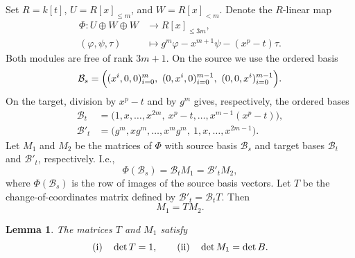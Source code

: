 \documentclass{amsart}
\newtheorem{lemma}[theorem]{Lemma}
\numberwithin{equation}{section}
\begin{document}
Set $R=k[t]$, $U=R[x]_{\le m}$, and $W=R[x]_{<m}$. 
Denote the $R$-linear map
\begin{equation}\label{eq_common-map}
  \begin{aligned}
    \Phi\colon U\oplus W\oplus W
      &\longrightarrow R[x]_{\le 3m},\\
    (\varphi,\psi,\tau)&\longmapsto g^m \varphi-x^{m+1}\psi-(x^p-t)\tau.
  \end{aligned}
\end{equation}
Both modules are free of rank $3m+1$. On the source we use
the ordered basis
\[
  \mathcal B_s=
  \Bigl(
    (x^i,0,0)_{i=0}^{m},\
    (0,x^i,0)_{i=0}^{m-1},\
    (0,0,x^i)_{i=0}^{m-1}
  \Bigr).
\]
On the target, division by $x^p-t$ and by $g^m$ gives,
respectively, the ordered bases
\begin{align*}
  \mathcal B_t
    &=\bigl(1,x,\ldots,x^{2m},\
            x^p-t,\ldots,x^{m-1}(x^p-t)\bigr),\\
  \mathcal B'_t
    &=\bigl(g^m,xg^m,\ldots,x^mg^m,\
            1,x,\ldots,x^{2m-1}\bigr).
\end{align*}
Let $M_1$ and $M_2$ be the matrices of $\Phi$ with
source basis $\mathcal B_s$ and target bases $\mathcal B_t$
and $\mathcal B'_t$, respectively. I.e., 
\[
  \Phi(\mathcal B_s)=\mathcal B_t M_1=\mathcal B'_t M_2,
\]
where $\Phi(\mathcal B_s)$ is the row of images of the
source basis vectors. Let $T$ be the change-of-coordinates
matrix defined by $\mathcal B'_t=\mathcal B_t T$. Then
\begin{equation}\label{eq_key}
  M_1=TM_2.
\end{equation}

\begin{lemma}\label{lem_target-bases}
The matrices $T$ and $M_1$ satisfy
\[
  \textup{(i)}\quad \det T=1,
  \qquad
  \textup{(ii)}\quad \det M_1=\det B.
\]
\end{lemma}
\end{document}
